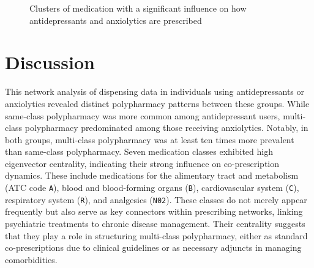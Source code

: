 \documentclass[
  authoryear,
  review]{elsarticle}
\begin{document}
\begin{figure}


\caption{\label{fig-hi-eigen}Clusters of medication with a significant
influence on how antidepressants and anxiolytics are prescribed}

\end{figure}%

\section{Discussion}\label{discussion}

This network analysis of dispensing data in individuals using
antidepressants or anxiolytics revealed distinct polypharmacy patterns
between these groups. While same-class polypharmacy was more common
among antidepressant users, multi-class polypharmacy predominated among
those receiving anxiolytics. Notably, in both groups, multi-class
polypharmacy was at least ten times more prevalent than same-class
polypharmacy. Seven medication classes exhibited high eigenvector
centrality, indicating their strong influence on co-prescription
dynamics. These include medications for the alimentary tract and
metabolism (ATC code \texttt{A}), blood and blood-forming organs
(\texttt{B}), cardiovascular system (\texttt{C}), respiratory system
(\texttt{R}), and analgesics (\texttt{N02}). These classes do not merely
appear frequently but also serve as key connectors within prescribing
networks, linking psychiatric treatments to chronic disease management.
Their centrality suggests that they play a role in structuring
multi-class polypharmacy, either as standard co-prescriptions due to
clinical guidelines or as necessary adjuncts in managing comorbidities.
\end{document}
